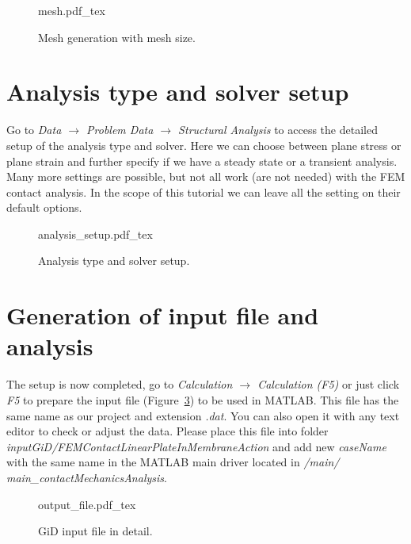 \documentclass[10pt,a4paper]{article}
\begin{document}
\begin{figure}[ht]
	\centering
	\footnotesize
    \def\svgwidth{0.9\textwidth}{mesh.pdf_tex}
	\caption{Mesh generation with mesh size.}
	\label{im:mesh}
\end{figure}


\section{Analysis type and solver setup}

Go to \textit{Data $\rightarrow$ Problem Data $\rightarrow$ Structural Analysis} to access the detailed setup of the analysis type and solver. Here we can choose between plane stress or plane strain and further specify if we have a steady state or a transient analysis. Many more settings are possible, but not all work (are not needed) with the FEM contact analysis. In the scope of this tutorial we can leave all the setting on their default options. 

\begin{figure}[ht]
	\centering
	\footnotesize
    \def\svgwidth{0.5\textwidth}{analysis_setup.pdf_tex}
	\caption{Analysis type and solver setup.}
	\label{im:analysis_setup}
\end{figure}



\section{Generation of input file and analysis}

The setup is now completed, go to \textit{Calculation $\rightarrow$ Calculation (F5)} or just click \textit{F5} to prepare the input file (Figure~\ref{im:output_file}) to be used in MATLAB. This file has the same name as our project and extension \textit{.dat}. You can also open it with any text editor to check or adjust the data. Please place this file into folder \textit{inputGiD/FEMContactLinearPlateInMembraneAction} and add new \textit{caseName} with the same name in the MATLAB main driver located in \textit{/main/ main\_contactMechanicsAnalysis}.

\begin{figure}[ht]
	\centering
	\footnotesize
    \def\svgwidth{0.9\textwidth}{output_file.pdf_tex}
	\caption{GiD input file in detail.}
	\label{im:output_file}
\end{figure}
\end{document}
